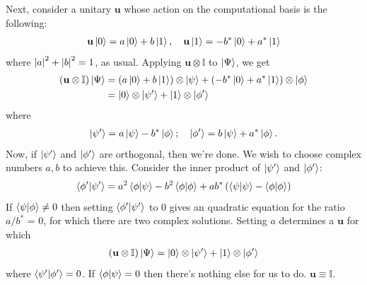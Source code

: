 \documentclass{book}
\theoremstyle{definition}
\newcommand{\nn}{\nonumber}
\newcommand{\lp}{\left(}
\newcommand{\rp}{\right)}
\newcommand{\Id}{\mathbb{I}}
\begin{document}
Next, consider a unitary $\mathbf{u}$ whose action on the computational basis is the following:
\begin{align}
\mathbf{u}\ket{0} = a\ket{0} + b\ket{1}, \quad \mathbf{u}\ket{1} = -b^*\ket{0} + a^*\ket{1}
\end{align}
where $\abs{a}^2 + \abs{b}^2=  1$, as usual. Applying $\mathbf{u}\otimes \Id$ to $\ket{\Psi}$, we get
\begin{align}
\lp\mathbf{u}\otimes \Id\rp \ket{\Psi} &= \lp a\ket{0} + b\ket{1}  \rp\otimes\ket{\psi} +  \lp -b^*\ket{0} + a^*\ket{1}\rp\otimes\ket{\phi}\nn\\
&= \ket{0}\otimes \ket{\psi'} + \ket{1}\otimes \ket{\phi'}
\end{align}
where
\begin{align}
\ket{\psi'}= a\ket{\psi} - b^*\ket{\phi}; \quad \ket{\phi'} = b\ket{\psi} + a^*\ket{\phi}.
\end{align}
Now, if $\ket{\psi'}$ and $\ket{\phi'}$ are orthogonal, then we're done. We wish to choose complex numbers $a,b$ to achieve this. Consider the inner product of $\ket{\psi'}$ and $\ket{\phi'}$:
\begin{align}
\braket{\phi'}{\psi'} = a^2\braket{\phi}{\psi} - b^2\braket{\phi}{\phi} + {ab^*\lp \braket{\psi}{\psi} - \braket{\phi}{\phi} \rp}
\end{align}
If $\braket{\psi}{\phi} \neq 0$ then setting $\braket{\phi'}{\psi'}$ to 0 gives an quadratic equation for the ratio $a/b^*$ = 0, for which there are two complex solutions. Setting $a$ determines a $\mathbf{u}$ for which
\begin{align}
\lp \mathbf{u}\otimes \Id \rp\ket{\Psi} = \ket{0}\otimes\ket{\psi'} + \ket{1}\otimes\ket{\phi'}
\end{align} 
where $\braket{\psi'}{\phi'} = 0$. If $\braket{\phi}{\psi} =0$ then there's nothing else for us to do. $\mathbf{u} \equiv \Id$. \\
\end{document}
